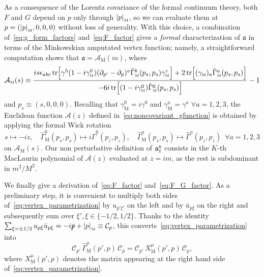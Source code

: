 \documentclass[a4paper, 11pt]{article}
\newcommand{\gyr}{\mathfrak{a}}								%
\newcommand{\rgyr}{\gyr_\textsc{z}^\textsc{r}}
\newcommand{\mnorm}[1]			
	{\abs*{#1}_{\! \scriptscriptstyle \mathrm{M}}}			%
\newcommand{\mink}{{\scriptscriptstyle{\mathrm{M}}}}		%
\newcommand{\mproj}[1]{\mathcal{C}_{#1}}					%
\theoremstyle{thm}
\begin{document}
As a consequence of the Lorentz covariance of the formal continuum theory, both $F$ and $G$ depend on $p$ only through 
$\mnorm{p}$, so we can evaluate them at $p = (\mnorm{p}, 0, 0, 0)$ without loss of generality. With this choice, a combination of~\eqref{eq:g_form_factors} and~\eqref{eq:F_factor} gives a \emph{formal} characterization of $\gyr$ in terms of the Minkowskian amputated vertex function; namely, a straightforward computation shows that $\gyr = \mathcal{A}_\mink(m)$, where
\begin{equation}
\mathcal{A}_\mink(s) \equiv \frac{i s \epsilon_{a b c} \tr[\gamma^5 (1 - i \gamma^0_\mink)(\partial_{p'} - \partial_p)^a \hat{\Gamma}^b_\mink(p_s, p_s) \gamma^c_\mink] + 2 \tr[ (\gamma_\mink)_a \hat{\Gamma}^a_\mink(p_s, p_s) ]}{-6i \tr[(1 - i \gamma^0_\mink) \hat{\Gamma}^0_\mink(p_s, p_s)]} - 1
\end{equation}
and $p_s \equiv (s, 0, 0, 0)$. Recalling that $\gamma^0_\mink = i \gamma^0$ and $\gamma^a_\mink = \gamma^a \,\, \forall a = 1, 2, 3$, the Euclidean function $\mathcal{A}(z)$ defined in~\eqref{eq:noncovariant_gfunction} is obtained by applying the formal Wick rotation
\begin{equation}
s \mapsto -iz, \quad \hat{\Gamma}^0_\mink(p_s, p_s) \mapsto i\hat{\Gamma}^0(p_z, p_z), \quad \hat{\Gamma}^a_\mink(p_s, p_s) \mapsto\hat{\Gamma}^a(p_z, p_z) \,\,\, \forall a = 1, 2, 3
\end{equation} 
on $\mathcal{A}_\mink(s)$. Our non perturbative definition of $\rgyr$ consists in the $K$-th MacLaurin polynomial of $\mathcal{A}(z)$ evaluated at $z = im$, as the rest is subdominant in $m^2/M^2$.

We finally give a derivation of~\eqref{eq:F_factor} and~\eqref{eq:F_G_factor}. As a preliminary step, it is convenient to multiply both sides of~\eqref{eq:vertex_parametrization} by $u_{p' \xi'}$ on the left and by $\bar{u}_{p \xi}$ on the right and subsequently sum over $\xi', \xi \in \lbrace -1/2, 1/2 \rbrace$. Thanks to the identity $\sum_{\xi=\pm 1/2} u_{p \xi} \bar{u}_{p \xi} = -i\slashed{p} + \mnorm{p} \equiv \mproj{p}$, this converts~\eqref{eq:vertex_parametrization} into 
\begin{equation}
\label{eq:form_factors_matrix}
\mproj{p'} \, \hat{\Gamma}^\mu_\mink(p', p) \, \mproj{p} = \mproj{p'} \, X^\mu_\mink(p', p) \, \mproj{p},
\end{equation}
where $X^\mu_\mink(p', p)$ denotes the matrix appearing at the right hand side of~\eqref{eq:vertex_parametrization}.
\end{document}
